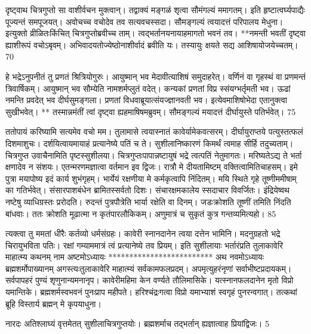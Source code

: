   दृष्ट्वाथ चित्रगुप्तो सा वाशीर्वचन मुक्त्वान्।
 तद्वाक्यं मङ्गळं शृत्वा सौमंगल्यं ममागतम्।
 इति हृष्टात्वर्घ्यपाद्यैः पूज्यन्तं समपूजयत्।
 अवोचच्च वचोदेव तव सत्यवचस्सदा।
 सौमङ्गल्यं त्वयादत्तं परिपालय मेधुना।
 इत्युक्तो व्रीळितःकिंचित् चित्रगुप्तोब्रवीच्च ताम्।
 त्वद्भर्तानयनायाहमागतो भवनं तव।
 **नमन्ती भवतीं दृष्ट्वा ह्याशीरूपं वचोऽबृवम्।
 अभिवादयतोज्येष्ठोनाशीर्वादं ब्रवीति यः।
 तस्यायुः क्षयते सद्य आशिषायोजयेच्चतम्।
 70

  हे भद्रेऽनुपनीतं तु प्रणतं श्रित्रियोगुरुः।
 आयुष्मान् भव मेदावीत्याशिषं समुदाहरेत्।
 वर्णिनं वा गृहस्थं वा प्रणमन्तं त्रिवार्षिकम्।
 आयुष्मान् भव सौम्येति नामशर्मप्लुतं वदेत्।
 कन्यकां प्रणतां विप्र स्संयग्भर्तृमती भव।
 ऊढां नमन्ति प्रवदेत् भव दीर्घसुमङ्गला।
 प्रणतां विधवाब्रूयात्संयज्ज्ञानवती भव।
 इत्येवमाशिषोभेदा एतानुक्त्वा सुखीभवेत्।
 ** तस्मान्नमंतीं त्वां दृष्ट्वा ह्यहमाषिषमब्रुवम्।
 सौमङ्गल्यं मयादत्तं दीर्घायुस्ते पतिर्भवेत्।
 75

 
ततोपायं करिष्यामि सत्यमेव वचो मम।
 तुलामासे त्वयास्नातं कावेर्यामेकवत्सरम्।
 दीर्घायुराप्तये पत्युस्तत्फलं दिशमाशुचः।
 दर्शयित्वायमायाहं प्रत्यानेष्ये पतिं च ते।
 सुशीलानिष्कारणं किमर्थं त्वमाह सीर्हि तदुच्यताम्।
 चित्रगुप्त उवाचैनामिति पृष्टस्सुशीलया।
 चित्रगुप्तःपापान्नष्टायुषं भद्रे त्वत्पतिं नेतुमागतः।
 मरिष्यतेऽद्य ते भर्ता क्षणादेव न संशयः।
 एतन्मरणमज्ञात्वा वर्तमान इव द्विजः।
 रात्रौ मे दीयतामिष्टम् वक्तित्वामितिचाहसम्।
 इमे पुत्रा मयापोष्य इदं कार्य शुभंगृहम्।
 भार्येयं रक्षणीया मे कर्मकृत्वापि निंदितम्।
 मयि स्थिते गृहे तूष्णीममीषाम् का गतिर्भवेत्।
 संसारपाशबंधेन ब्रामितस्सर्वतो दिशः।
 संचारक्षमकालेय स्सदाचार विवर्जितः।
 इंद्रियेष्वथ नष्टेषु व्याधिग्रस्तः प्ररोदति।
 रुदन्तं पुत्रपौत्रेति भार्या रक्षेति वा दिनम्।
 जडःक्रोशति तूष्णीं तमिति निंदति बांधवाः।
 ततः क्रोशति मूढात्मा न कृतंपारलौकिकम्।
 अणुमात्रं च सुकृतं कुत्र गन्तव्यमित्यहो।
 85

 
त्यक्त्वा तु ममतां धीरैः कर्तव्यो धर्मसंग्रहः।
 कावेरी स्नानदानेन त्वया दत्तेन भामिनि।
 मदनुग्रहतो भद्रे चिरायुभविता पतिः।
 रक्षां गम्याममात्रं त्वं प्रत्यानेष्ये तव प्रियम्।
 इति सुशीलायाः भर्तारंप्रति तुलाकावेरि माहात्म्य
कथनम् नाम अष्टमोऽध्यायः
*************************
अथ नवमोऽध्यायः
ब्रह्मशर्मोपाख्यानम् अगस्त्यःतुलाकावेरि माहात्म्यं सर्वकामफलप्रदम्।
 अपमृत्युहरंनृणां सर्वाभीष्टप्रदायकम्।
 सर्वपापहरं पुण्यं शृणुनान्यमनानृप।
 कावेरीमहिमा केन वर्ण्यते तौलिमासिके।
 यत्स्नानफलदानेन मृतो विप्रो यमान्तिके।
 ब्रह्मशर्मस्वभवनं पुनःप्राप महीपते।
 हरिश्चंद्रःगत्वा विप्रो यमाभ्याशं स्वगृहं पुनरन्वगात्।
 तत्कथां ब्रूहि विस्तार्य ब्रह्मन् मे कृपयाधुना।
 
नारदः
अतिश्लाघ्यं वृत्तमेतत् सुशीलाचित्रगुप्तयोः।
 ब्रह्मशर्माच तद्भर्तान् ह्यज्ञात्वाह प्रियांद्विजः।
 5

